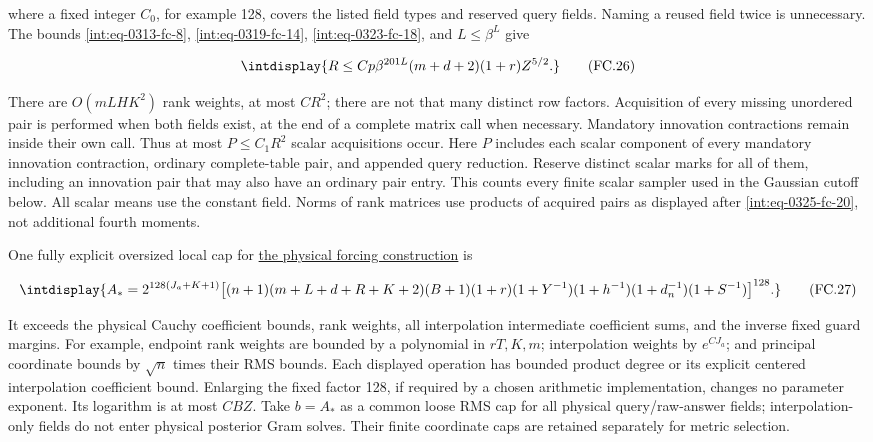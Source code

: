 
where a fixed integer \(C_0\), for example 128, covers the listed field types and reserved query fields. Naming a reused field twice is unnecessary. The bounds \eqref{int:eq-0313-fc-8}, \eqref{int:eq-0319-fc-14}, \eqref{int:eq-0323-fc-18}, and \(L\le\beta^L\) give


\begingroup\renewcommand{\theHequation}{intdisplay.725}
\begin{equation}
\intdisplay{
R\le Cp\beta^{201L}(m+d+2)(1+r)Z^{5/2}.
}
\tag{FC.26}
\label{int:eq-0331-fc-26}
\end{equation}
\endgroup


There are \(O(mLHK^2)\) rank weights, at most \(CR^2\); there are not that many distinct row factors. Acquisition of every missing unordered pair is performed when both fields exist, at the end of a complete matrix call when necessary. Mandatory innovation contractions remain inside their own call. Thus at most \(P\le C_1R^2\) scalar acquisitions occur. Here \(P\) includes each scalar component of every mandatory innovation contraction, ordinary complete-table pair, and appended query reduction. Reserve distinct scalar marks for all of them, including an innovation pair that may also have an ordinary pair entry. This counts every finite scalar sampler used in the Gaussian cutoff below. All scalar means use the constant field. Norms of rank matrices use products of acquired pairs as displayed after \eqref{int:eq-0325-fc-20}, not additional fourth moments.



One fully explicit oversized local cap for \hyperref[int:decoder-physical-forcing]{the physical forcing construction} is


\begingroup\renewcommand{\theHequation}{intdisplay.726}
\begin{equation}
\intdisplay{
A_\ast=2^{128(J_a+K+1)}
\big[(n+1)(m+L+d+R+K+2)(B+1)(1+r)
(1+Y^{-1})(1+h^{-1})(1+d_n^{-1})(1+S^{-1})\big]^{128}.
}
\tag{FC.27}
\label{int:eq-0332-fc-27}
\end{equation}
\endgroup


It exceeds the physical Cauchy coefficient bounds, rank weights, all interpolation intermediate coefficient sums, and the inverse fixed guard margins. For example, endpoint rank weights are bounded by a polynomial in \(rT,\allowbreak K,\allowbreak m\); interpolation weights by \(e^{CJ_a}\); and principal coordinate bounds by \(\sqrt n\) times their RMS bounds. Each displayed operation has bounded product degree or its explicit centered interpolation coefficient bound. Enlarging the fixed factor 128, if required by a chosen arithmetic implementation, changes no parameter exponent. Its logarithm is at most \(CBZ\). Take \(b=A_\ast\) as a common loose RMS cap for all physical query/raw-answer fields; interpolation-only fields do not enter physical posterior Gram solves. Their finite coordinate caps are retained separately for metric selection.


